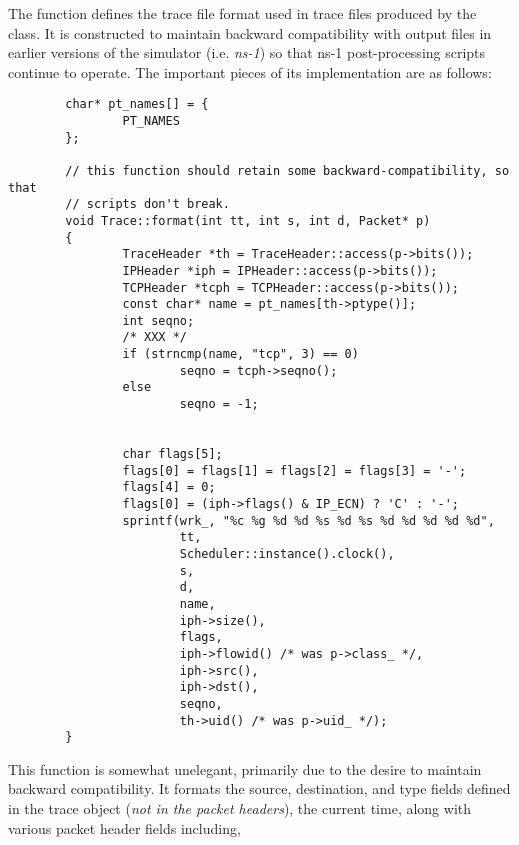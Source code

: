\subsubsection{}

The  function defines the trace file format used
in trace files produced by the  class.
It is constructed to maintain backward compatibility with output files
in earlier versions of the simulator (i.e. {\em ns-1}) so that ns-1
post-processing scripts continue to operate.
The important pieces of its implementation are as follows:
\begin{small}
\begin{verbatim}
        char* pt_names[] = {
                PT_NAMES
        };

        // this function should retain some backward-compatibility, so that
        // scripts don't break.
        void Trace::format(int tt, int s, int d, Packet* p)
        {
                TraceHeader *th = TraceHeader::access(p->bits());
                IPHeader *iph = IPHeader::access(p->bits());
                TCPHeader *tcph = TCPHeader::access(p->bits());
                const char* name = pt_names[th->ptype()];
                int seqno;
                /* XXX */
                if (strncmp(name, "tcp", 3) == 0)
                        seqno = tcph->seqno();
                else
                        seqno = -1;


                char flags[5];
                flags[0] = flags[1] = flags[2] = flags[3] = '-';
                flags[4] = 0;
                flags[0] = (iph->flags() & IP_ECN) ? 'C' : '-';
                sprintf(wrk_, "%c %g %d %d %s %d %s %d %d %d %d %d",
                        tt,
                        Scheduler::instance().clock(),
                        s,
                        d,
                        name,
                        iph->size(),
                        flags,
                        iph->flowid() /* was p->class_ */,
                        iph->src(),
                        iph->dst(),
                        seqno,
                        th->uid() /* was p->uid_ */);
        }
\end{verbatim}
\end{small}
This function is somewhat unelegant, primarily due to the desire
to maintain backward compatibility.
It formats the source, destination, and type fields defined in the
trace object ({\em not in the packet headers}), the current time,
along with various packet header fields including,
